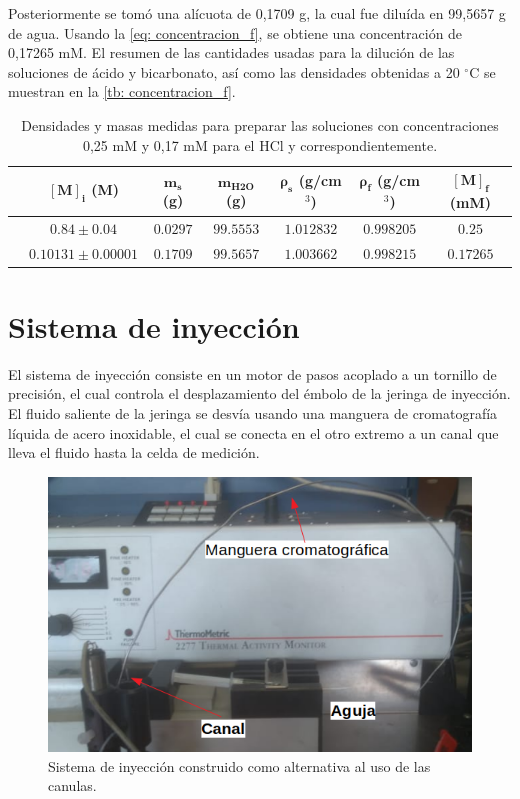 	Posteriormente se tom\'o una al\'icuota de 0,1709 g, la cual fue dilu\'ida en 99,5657 g de agua. Usando la \autoref{eq: concentracion_f}, se obtiene una concentraci\'on de 0,17265 mM. El resumen de las cantidades usadas para la diluci\'on de las soluciones de \'acido y bicarbonato, as\'i como las densidades obtenidas a 20 $^\circ$C se muestran en la \autoref{tb: concentracion_f}.
	\begin{table}[h]
		\centering
		\caption{Densidades y masas medidas para preparar las soluciones con concentraciones 0,25 mM y 0,17 mM para el HCl y  correspondientemente.}
		\small
		\begin{tabular}{c|cccccc}
			\hline
			& $\mathbf{[M]_i}$ (M) & $\mathbf{m_s}$ (g) & $\mathbf{m_{\text{H2O}}}$ (g) & $\bm{\rho_s}$ (g/cm$^3$)& $\bm{\rho_f}$ (g/cm$^3$) & $\mathbf{[M]_f}$ (mM) \\
			\hline
			\textbf{\ce{HCl}} & $0.84 \pm 0.04$ & $0.0297$ & $99.5553$ & $1.012832$ & $0.998205$ & $0.25$ \\
			\textbf{\ce{KHCO3}} & $0.10131\pm 0.00001$ & $0.1709$ & $99.5657$ & $1.003662$ & $0.998215$ & $0.17265$ \\
			\hline
		\end{tabular}
		\label{tb: concentracion_f}
	\end{table}
	
\section{Sistema de inyecci\'on}
	El sistema de inyecci\'on consiste en un motor de pasos acoplado a un tornillo de precisión, el cual controla el desplazamiento del émbolo de la jeringa de inyección. El fluido saliente de la jeringa se desvía usando una manguera de cromatografía líquida de acero inoxidable, el cual se conecta en el otro extremo a un canal que lleva el fluido hasta la celda de medición.
	
	\begin{figure}[h]
		\centering
		\includegraphics[width=0.5\linewidth]{Figures/sistemaInyeccion}
			
		\caption{Sistema de inyección construido como alternativa al uso de las canulas.}
		\label{fig: sistemaInyeccion}
	\end{figure}
	
